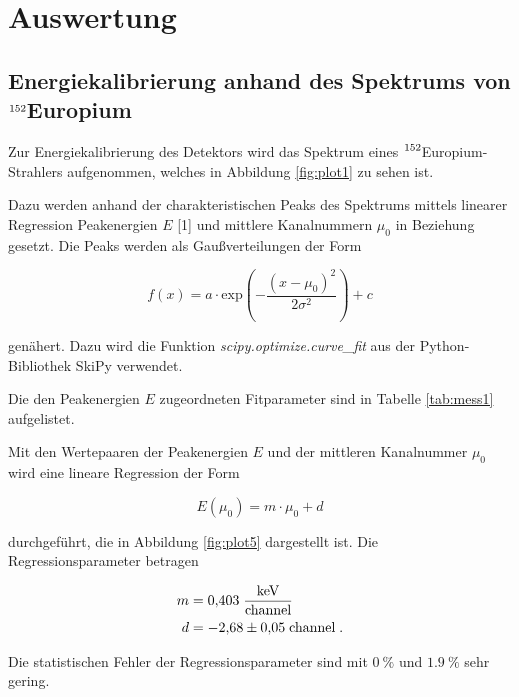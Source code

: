 \section{Auswertung}
\label{sec:Auswertung}


\subsection{Energiekalibrierung anhand des Spektrums von $\ce{^{152}}$Europium}

Zur Energiekalibrierung des Detektors wird das Spektrum eines $\ce{^{152}}$Europium-Strahlers aufgenommen, welches in Abbildung
\ref{fig:plot1} zu sehen ist.



Dazu werden anhand der charakteristischen Peaks des Spektrums mittels linearer Regression Peakenergien $E$ [1] und mittlere 
Kanalnummern $\mu_0$ in Beziehung gesetzt.
Die Peaks werden als Gaußverteilungen der Form 

\begin{equation}
  f(x) = a \cdot \text{exp}\left( - \frac{(x-\mu_0)^2}{2\sigma^2}\right) + c
  \label{eqn:gauss}
\end{equation}

genähert. Dazu wird die Funktion \textit{scipy.optimize.curve\_fit} aus der Python-Bibliothek SkiPy verwendet.

Die den Peakenergien $E$ zugeordneten Fitparameter sind in Tabelle \ref{tab:mess1} aufgelistet.

Mit den Wertepaaren der Peakenergien $E$ und der mittleren Kanalnummer $\mu_0$ wird eine lineare Regression der Form

\begin{equation}
  E(\mu_0) = m \cdot \mu_0 + d
  \label{eqn:eich}
\end{equation}
  
durchgeführt, die in Abbildung \ref{fig:plot5} dargestellt ist.
Die Regressionsparameter betragen

\begin{align*}
  m &= \num{0.403}\;\frac{\si{\kilo\eV}}{\text{channel}} \\
  d &= \num{-2.68 +- 0.05}\;\text{channel} \; .
\end{align*}

Die statistischen Fehler der Regressionsparameter sind mit $\SI{0}{\percent}$ und $\SI{1.9}{\percent}$ sehr gering.

